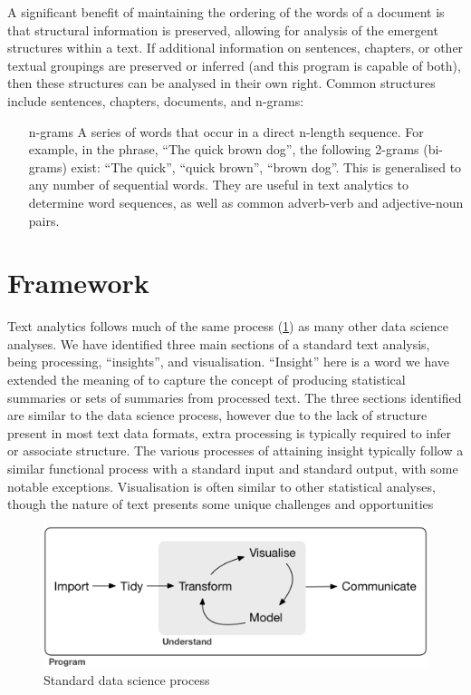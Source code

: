 \message{ !name(jason-cairns-dissertation.tex)}\documentclass[11pt, a4paper, titlepage]{report}
\begin{document}
A significant benefit of maintaining the ordering of the words of a
document is that structural information is preserved, allowing for
analysis of the emergent structures within a text. If additional
information on sentences, chapters, or other textual groupings are
preserved or inferred (and this program is capable of both), then
these structures can be analysed in their own right. Common structures
include sentences, chapters, documents, and n-grams:

\begin{itemize}
\item[\gls{n-grams}] A series of words that occur in a direct
  n-length sequence. For example, in the phrase, ``The quick brown
  dog'', the following 2-grams (bi-grams) exist: ``The quick'', ``quick
  brown'', ``brown dog''. This is generalised to any number of
  sequential words. They are useful in text analytics to determine
  word sequences, as well as common adverb-verb and adjective-noun
  pairs.
\end{itemize}

\section{Framework}\label{sec:framework-used}

Text analytics follows much of the same process (\cref{fig:std-ds}) as
many other data science analyses. We have identified three main
sections of a standard text analysis, being processing, ``insights'',
and visualisation. ``Insight'' here is a word we have extended the
meaning of to capture the concept of producing statistical summaries
or sets of summaries from processed text. The three sections
identified are similar to the data science process, however due to the
lack of structure present in most text data formats, extra processing
is typically required to infer or associate structure. The various
processes of attaining insight typically follow a similar functional
process with a standard input and standard output, with some notable
exceptions. Visualisation is often similar to other statistical
analyses, though the nature of text presents some unique challenges
and opportunities

\begin{figure}[h]
  \centering
  \includegraphics[scale=0.8]{std-ds.png}
  \caption{Standard data science process\autocite{wickham2016r}\label{fig:std-ds}}
\end{figure}
\end{document}
